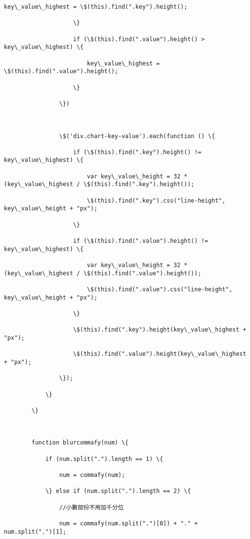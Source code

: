 \documentclass[11pt]{article}
\begin{document}
\begin{Verbatim}[commandchars=\\\{\}]
                        key\_value\_highest = \$(this).find(".key").height();

                    \}

                    if (\$(this).find(".value").height() > key\_value\_highest) \{

                        key\_value\_highest = \$(this).find(".value").height();

                    \}

                \})



                \$('div.chart-key-value').each(function () \{

                    if (\$(this).find(".key").height() != key\_value\_highest) \{

                        var key\_value\_height = 32 * (key\_value\_highest / \$(this).find(".key").height());

                        \$(this).find(".key").css("line-height", key\_value\_height + "px");

                    \}

                    if (\$(this).find(".value").height() != key\_value\_highest) \{

                        var key\_value\_height = 32 * (key\_value\_highest / \$(this).find(".value").height());

                        \$(this).find(".value").css("line-height", key\_value\_height + "px");

                    \}

                    \$(this).find(".key").height(key\_value\_highest + "px");

                    \$(this).find(".value").height(key\_value\_highest + "px");

                \});

            \}

        \}



        function blurcommafy(num) \{

            if (num.split(".").length == 1) \{

                num = commafy(num);

            \} else if (num.split(".").length == 2) \{

                //小數部份不用加千分位

                num = commafy(num.split(".")[0]) + "." + num.split(".")[1];


\end{Verbatim}
\end{document}
